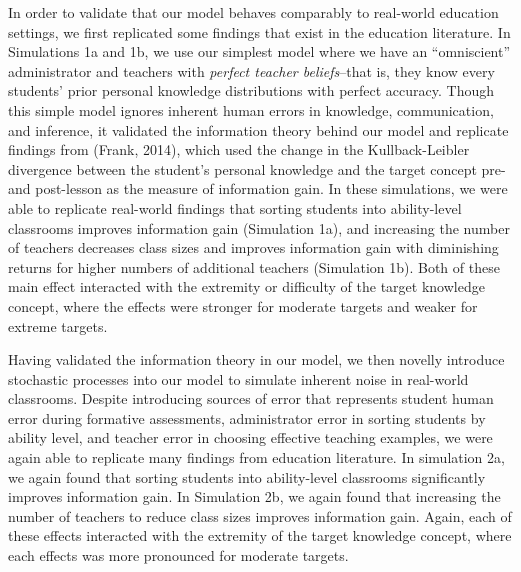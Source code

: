 \documentclass[10pt, letterpaper]{apa6}
\begin{document}
In order to validate that our model behaves comparably to real-world
education settings, we first replicated some findings that exist in the
education literature. In Simulations 1a and 1b, we use our simplest
model where we have an ``omniscient'' administrator and teachers with
\emph{perfect teacher beliefs}--that is, they know every students' prior
personal knowledge distributions with perfect accuracy. Though this
simple model ignores inherent human errors in knowledge, communication,
and inference, it validated the information theory behind our model and
replicate findings from (Frank, 2014), which used the change in the
Kullback-Leibler divergence between the student's personal knowledge and
the target concept pre- and post-lesson as the measure of information
gain. In these simulations, we were able to replicate real-world
findings that sorting students into ability-level classrooms improves
information gain (Simulation 1a), and increasing the number of teachers
decreases class sizes and improves information gain with diminishing
returns for higher numbers of additional teachers (Simulation 1b). Both
of these main effect interacted with the extremity or difficulty of the
target knowledge concept, where the effects were stronger for moderate
targets and weaker for extreme targets.

Having validated the information theory in our model, we then novelly
introduce stochastic processes into our model to simulate inherent noise
in real-world classrooms. Despite introducing sources of error that
represents student human error during formative assessments,
administrator error in sorting students by ability level, and teacher
error in choosing effective teaching examples, we were again able to
replicate many findings from education literature. In simulation 2a, we
again found that sorting students into ability-level classrooms
significantly improves information gain. In Simulation 2b, we again
found that increasing the number of teachers to reduce class sizes
improves information gain. Again, each of these effects interacted with
the extremity of the target knowledge concept, where each effects was
more pronounced for moderate targets.
\end{document}
